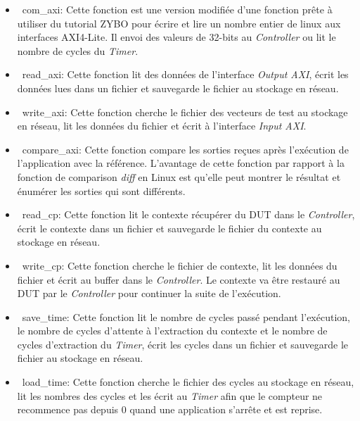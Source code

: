 \begin{itemize}
	\item\ com\_axi:
	Cette fonction est une version modifiée d'une fonction prête à utiliser du tutorial ZYBO pour écrire et lire un nombre entier
	de linux aux interfaces AXI4-Lite. Il envoi des valeurs de 32-bits au \emph{Controller} ou lit le nombre de cycles du \emph{Timer}.

	\item\ read\_axi:
	Cette fonction lit des données de l'interface \emph{Output AXI}, écrit les données lues dans un fichier et sauvegarde le fichier au stockage en réseau.
	
	\item\ write\_axi:
	Cette fonction cherche le fichier des vecteurs de test au stockage en réseau, lit les données du fichier et écrit à l'interface \emph{Input AXI}.

	\item\ compare\_axi:
	Cette fonction compare les sorties reçues après l'exécution de l'application avec la référence.
	L'avantage de cette fonction par rapport à la fonction de comparison \emph{diff} en Linux est qu'elle peut montrer le résultat et énumérer les sorties qui sont différents.

	\item\ read\_cp:
	Cette fonction lit le contexte récupérer du DUT dans le \emph{Controller}, écrit le contexte dans un fichier
	et sauvegarde le fichier du contexte au stockage en réseau.
	
	\item\ write\_cp:
	Cette fonction cherche le fichier de contexte, lit les données du fichier et écrit au buffer dans le \emph{Controller}.
	Le contexte va être restauré au DUT par le \emph{Controller} pour continuer la suite de l'exécution.
	
	\item\ save\_time:
	Cette fonction lit le nombre de cycles passé pendant l'exécution, le nombre de cycles d'attente à
	l'extraction du contexte et le nombre de cycles d'extraction du \emph{Timer}, écrit les cycles dans un fichier
	et sauvegarde le fichier au stockage en réseau.
	
	\item\ load\_time:
	Cette fonction cherche le fichier des cycles au stockage en réseau, lit les nombres des cycles
	et les écrit au \emph{Timer} afin que le compteur ne recommence pas depuis 0 quand une application
	s'arrête et est reprise.

\end{itemize}

